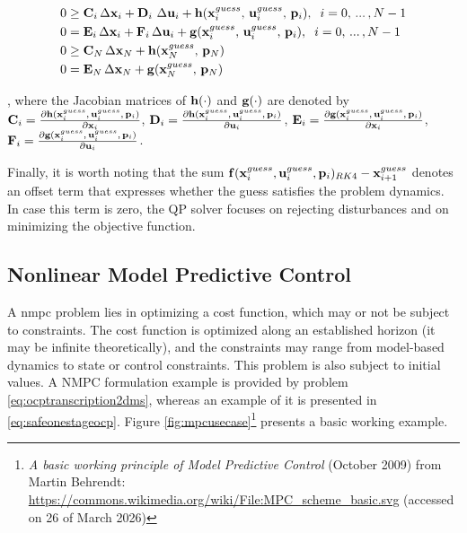 \begin{subequations}
\begin{align}
		0 &\geq \mathbf{C}_i\,\Delta \mathbf{x}_i + \mathbf{D}_i \,\,\Delta \mathbf{u}_i + \mathbf{h}(\mathbf{x}_i^{guess},\, \mathbf{u}_i^{guess},\,\mathbf{p}_i), \hspace{0.2cm} i= 0,\,...\,,N-1 \label{subeq:qpnonlinearcons}\\
		0 &= \mathbf{E}_i \, \Delta \mathbf{x}_i + \mathbf{F}_i \, \Delta \mathbf{u}_i + \mathbf{g}(\mathbf{x}_i^{guess},\,\mathbf{u}_i^{guess},\,\mathbf{p}_i), \hspace{0.2cm} i= 0,\,...\,,N-1 \label{subeq:qplinearcons}\\
		0 &\geq \mathbf{C}_N \, \Delta \mathbf{x}_N + \mathbf{h}(\mathbf{x}_N^{guess},\,\mathbf{p}_N)\\
		0 &= \mathbf{E}_N \, \Delta \mathbf{x}_N + \mathbf{g}(\mathbf{x}_N^{guess},\,\mathbf{p}_N)
	\end{align}
\end{subequations}

\noindent , where the Jacobian matrices of $\mathbf{h}(\cdot)$ and $\mathbf{g}(\cdot)$ are denoted by $\mathbf{C}_i = \pdv{\mathbf{h}(\mathbf{x}_i^{guess},\,\mathbf{u}_i^{guess},\,\mathbf{p}_i)}{\mathbf{x}_i}$, $\mathbf{D}_i = \pdv{\mathbf{h}(\mathbf{x}_i^{guess},\,\mathbf{u}_i^{guess},\,\mathbf{p}_i)}{\mathbf{u}_i}$, $\mathbf{E}_i = \pdv{\mathbf{g}(\mathbf{x}_i^{guess},\,\mathbf{u}_i^{guess},\,\mathbf{p}_i)}{\mathbf{x}_i}$, $\mathbf{F}_i = \pdv{\mathbf{g}(\mathbf{x}_i^{guess},\,\mathbf{u}_i^{guess},\,\mathbf{p}_i)}{\mathbf{u}_i}$.

Finally, it is worth noting that the sum $\mathbf{f}(\mathbf{x}_i^{guess}, \mathbf{u}_i^{guess}, \mathbf{p}_i)_{RK4} - \mathbf{x}_{i+1}^{guess}$ denotes an offset term that expresses whether the guess satisfies the problem dynamics. In case this term is zero, the QP solver focuses on rejecting disturbances and on minimizing the objective function. 

\subsection{Nonlinear Model Predictive Control}
\label{subsection:nmpc}

A \acrshort{nmpc} problem \cite{Rawlings2013, grunenmpc} lies in optimizing a cost function, which may or not be subject to constraints. The cost function is optimized along an established horizon (it may be infinite theoretically), and the constraints may range from model-based dynamics to state or control constraints. This problem is also subject to initial values. A NMPC formulation example is provided by problem \eqref{eq:ocptranscription2dms}, whereas an example of it is presented in \eqref{eq:safeonestageocp}. Figure \ref{fig:mpcusecase}\footnote{\textit{A basic working principle of Model Predictive Control} (October 2009) from  Martin Behrendt: \url{https://commons.wikimedia.org/wiki/File:MPC_scheme_basic.svg} (accessed on 26 of March 2026)} presents a basic working example.

